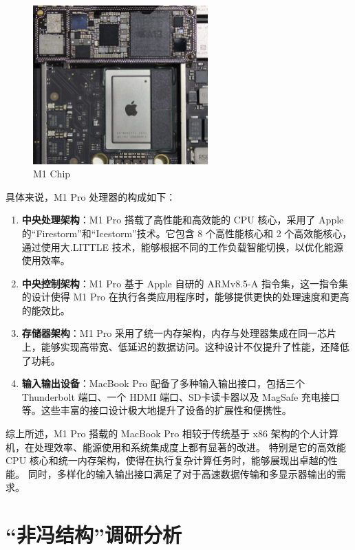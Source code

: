 \documentclass[12pt]{article} %
\theoremstyle{definition}
\begin{document}
\begin{figure}[h]
  \centering
  \includegraphics[width=0.6\textwidth]{./figs/M1_A13_comparison_MacMini9_1_M1.jpg}
  \caption{M1 Chip\cite{Sonic84002020Image}}
  \label{fig:AppleM1}
\end{figure}

具体来说，M1 Pro 处理器\cite{AppleM12023}的构成如下：

\begin{enumerate}
  \item \textbf{中央处理架构}：M1 Pro 搭载了高性能和高效能的 CPU 核心，采用了 Apple 的“Firestorm”和“Icestorm”技术。它包含 8 个高性能核心和 2 个高效能核心\cite{GSMArenaAppleM1}，通过使用大.LITTLE 技术，能够根据不同的工作负载智能切换，以优化能源使用效率。
  \item \textbf{中央控制架构}：M1 Pro 基于 Apple 自研的 ARMv8.5-A 指令集，这一指令集的设计使得 M1 Pro 在执行各类应用程序时，能够提供更快的处理速度和更高的能效比。
  \item \textbf{存储器架构}：M1 Pro 采用了统一内存架构，内存与处理器集成在同一芯片上，能够实现高带宽、低延迟的数据访问。这种设计不仅提升了性能，还降低了功耗。
  \item \textbf{输入输出设备}：MacBook Pro 配备了多种输入输出接口，包括三个 Thunderbolt 端口、一个 HDMI 端口、SD卡读卡器以及 MagSafe 充电接口等。这些丰富的接口设计极大地提升了设备的扩展性和便携性。
\end{enumerate}

综上所述，M1 Pro 搭载的 MacBook Pro 相较于传统基于 x86 架构的个人计算机，在处理效率、能源使用和系统集成度上都有显著的改进。
特别是它的高效能 CPU 核心和统一内存架构，使得在执行复杂计算任务时，能够展现出卓越的性能。
同时，多样化的输入输出接口满足了对于高速数据传输和多显示器输出的需求。

\section{“非冯结构”调研分析}
\end{document}
